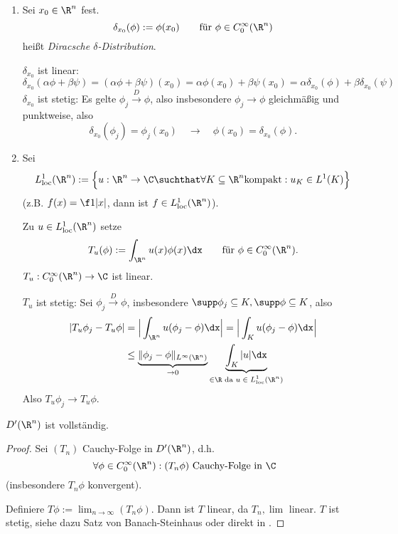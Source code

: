 \begin{ex} \label{5.5}
	\begin{enumerate}[1)]
		\item
			Sei $x_0 \in \R^n$ fest.
			\[
				\delta_{x_0}(\phi) := \phi(x_0) \qquad \text{für $\phi \in C_0^\infty(\R^n)$}
			\]
			heißt \emph{Diracsche $\delta$-Distribution}.

			$\delta_{x_0}$ ist linear:
			\[
				\delta_{x_0}(\alpha \phi + \beta \psi) 
				= (\alpha \phi + \beta \psi)(x_0)
				= \alpha \phi(x_0) + \beta \psi(x_0)
				= \alpha \delta_{x_0}(\phi) + \beta \delta_{x_0}(\psi)
			\]
			$\delta_{x_0}$ ist stetig: Es gelte $\phi_j \overset{D}\to \phi$, also insbesondere $\phi_j \to \phi$ gleichmäßig und punktweise, also
			\[
				\delta_{x_0}(\phi_j) = \phi_j(x_0) \quad \to \quad \phi(x_0) = \delta_{x_0}(\phi).
			\]
		\item
			Sei
			\[
				L_{\text{loc}}^1 (\R^n) := \Big\{ u : \R^n \to \C  \suchthat \forall K \subset \R^n  \text{kompakt} : u_K \in L^1(K) \Big\}
			\]
			(z.B. $f(x) = \f 1{|x|}$, dann ist $f \in L_{\text{loc}}^1(\R^n)$).

			Zu $u \in L_{\text{loc}}^1(\R^n)$ setze
			\[
				T_u(\phi) := \int_{\R^n} u(x) \phi(x) \dx \qquad \text{für $\phi \in C_0^\infty(\R^n)$}.
			\]
			$T_u : C_0^\infty(\R^n) \to \C$ ist linear.

			$T_u$ ist stetig:
			Sei $\phi_j \overset{D}{\to} \phi$, insbesondere $\supp \phi_j \subset K, \supp \phi \subset K$, also
			\begin{align*}
				|T_u \phi_j - T_u \phi| 
				&= \Big| \int_{\R^n} u (\phi_j-\phi) \dx \Big|
				= \Big| \int_{K} u (\phi_j-\phi) \dx \Big| \\
				&\le \underbrace{\|\phi_j - \phi\|_{L^\infty(\R^n)}}_{\to 0} \underbrace{\int_{K} |u| \dx}_{\in \R \text{ da $u\in L_{\text{loc}}^1(\R^n)$}}
			\end{align*}
			Also $T_u \phi_j \to T_u \phi$.
	\end{enumerate}
\end{ex}


\begin{st} \label{5.6}
	$D'(\R^n)$ ist vollständig.
	\begin{proof}
		Sei $(T_n)$ Cauchy-Folge in $D'(\R^n)$, d.h.
		\[
			\forall \phi \in C_0^\infty(\R^n) : (T_n \phi) \text{ Cauchy-Folge in $\C$}
		\]
		(insbesondere $T_n \phi$ konvergent).

		Definiere $T\phi := \lim_{n\to \infty} (T_n \phi)$.
		Dann ist $T$ linear, da $T_n, \lim$ linear.
		$T$ ist stetig, siehe dazu Satz von Banach-Steinhaus oder direkt in \cite{Walter}.
	\end{proof}
\end{st}

